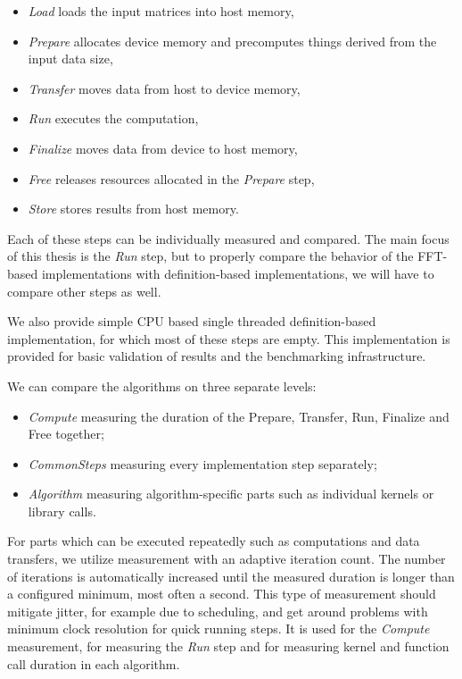 \begin{itemize}
	\item \textit{Load} loads the input matrices into host memory,
	\item \textit{Prepare} allocates device memory and precomputes things derived from the input data size,
	\item \textit{Transfer} moves data from host to device memory,
	\item \textit{Run} executes the computation,
	\item \textit{Finalize} moves data from device to host memory,
	\item \textit{Free} releases resources allocated in the \textit{Prepare} step,
	\item \textit{Store} stores results from host memory.
\end{itemize}

Each of these steps can be individually measured and compared. The main focus of this thesis is the \textit{Run} step, but to properly compare the behavior of the FFT-based implementations with definition-based implementations, we will have to compare other steps as well.

We also provide simple CPU based single threaded definition-based implementation, for which most of these steps are empty. This implementation is provided for basic validation of results and the benchmarking infrastructure. 


We can compare the algorithms on three separate levels:
\begin{itemize}
	\item \textit{Compute} measuring the duration of the Prepare, Transfer, Run, Finalize and Free together;
	\item \textit{CommonSteps} measuring every implementation step separately;
	\item \textit{Algorithm} measuring algorithm-specific parts such as individual kernels or library calls.
\end{itemize}

For parts which can be executed repeatedly such as computations and data transfers, we utilize measurement with an adaptive iteration count. The number of iterations is automatically increased until the measured duration is longer than a configured minimum, most often a second. This type of measurement should mitigate jitter, for example due to scheduling, and get around problems with minimum clock resolution for quick running steps. It is used for the \textit{Compute} measurement, for measuring the \textit{Run} step and for measuring kernel and function call duration in each algorithm.


